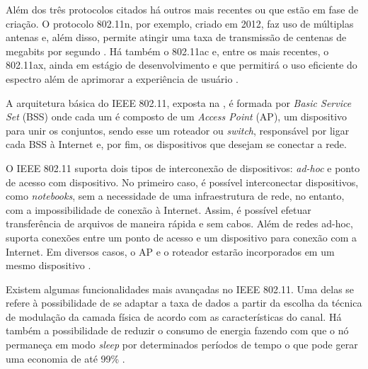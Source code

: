 Além dos três protocolos citados há outros mais recentes ou que estão em fase de criação. O protocolo 802.11n, por exemplo, criado em 2012, faz uso de múltiplas antenas e, além disso, permite atingir uma taxa de transmissão de centenas de megabits por segundo \cite{Kurose2012}. Há também o 802.11ac e, entre os mais recentes, o 802.11ax, ainda em estágio de desenvolvimento e que permitirá o uso eficiente do espectro além de aprimorar a experiência de usuário \cite{Afaqui2017}.

A arquitetura básica do IEEE 802.11, exposta na , é formada por \textit{Basic Service Set} (BSS) onde cada um é composto de um \textit{Access Point} (AP), um dispositivo para unir os conjuntos, sendo esse um roteador ou \textit{switch}, responsável por ligar cada BSS à Internet e, por fim, os dispositivos que desejam se conectar a rede.


O IEEE 802.11 suporta dois tipos de interconexão de dispositivos: \textit{ad-hoc} e ponto de acesso com dispositivo. No primeiro caso, é possível interconectar dispositivos, como \textit{notebooks}, sem a necessidade de uma infraestrutura de rede, no entanto, com a impossibilidade de conexão à Internet. Assim, é possível efetuar transferência de arquivos de maneira rápida e sem cabos. Além de redes ad-hoc, suporta conexões entre um ponto de acesso e um dispositivo para conexão com a Internet. Em diversos casos, o AP e o roteador estarão incorporados em um mesmo dispositivo \cite{Kurose2012}.



Existem algumas funcionalidades mais avançadas no IEEE 802.11. Uma delas se refere à possibilidade de se adaptar a taxa de dados a partir da escolha da técnica de modulação da camada física de acordo com as características do canal. Há também a possibilidade de reduzir o consumo de energia fazendo com que o nó permaneça em modo \textit{sleep} por determinados períodos de tempo o que pode gerar uma economia de até 99\% \cite{Kurose2012}.

